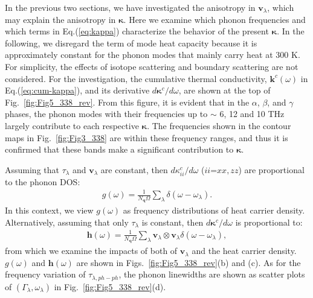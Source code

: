 \documentclass[twocolumn,amsmath,amssymb,a4paper,prb,superscriptaddress,floatfix]{revtex4-1}
\begin{document}
In the previous two sections, we have investigated the anisotropy in
$\mathbf{v}_\lambda$, which may explain the anisotropy in $\boldsymbol{\kappa}$.
Here we examine which phonon frequencies and which terms in Eq.(\ref{eq:kappa})
characterize the behavior of the present $\boldsymbol{\kappa}$. In the
following, we disregard the term of mode heat capacity because it is
approximately constant for the phonon modes that mainly carry heat at 300 K.
For simplicity, the effects of isotope scattering and boundary scattering are
not considered.  For the investigation, the cumulative thermal conductivity,
$\boldsymbol{k}^c(\omega)$ in Eq.(\ref{eq:cum-kappa}), and its derivative
$d\boldsymbol{\kappa}^c/d\omega$, are shown at the top of
Fig.~\ref{fig:Fig5_338_rev}. From this figure, it is evident that in the
$\alpha$, $\beta$, and $\gamma$ phases, the phonon modes with their frequencies
up to $\sim$ 6, 12 and 10 THz largely contribute to each respective
$\boldsymbol{\kappa}$. The frequencies shown in the contour maps in
Fig.~\ref{fig:Fig3_338} are within these frequency ranges, and thus it is
confirmed that these bands make a significant contribution to
$\boldsymbol{\kappa}$.  

Assuming that $\tau_\lambda$ and $\mathbf{v}_\lambda$ are constant, then
$d\kappa_{ii}^c/d\omega$ ($ii$=$xx,zz$) are proportional to the phonon
DOS: 
\begin{align}
 \label{eq:dos}
 g(\omega) = \frac{1}{N_\mathbf{q}\Omega}
 \sum_\lambda
 \delta(\omega-\omega_{\lambda}).
\end{align}
In this context, we view $g(\omega)$ as frequency distributions of heat
carrier density. Alternatively, assuming that only $\tau_\lambda$ is constant,
then $d\boldsymbol{\kappa}^c/d\omega$ is proportional to:
\begin{align}
 \label{eq:wdos}
 \boldsymbol{h}(\omega) = \frac{1}{N_\mathbf{q}\Omega}
 \sum_\lambda
 \mathbf{v}_\lambda \otimes \mathbf{v}_\lambda
 \delta(\omega-\omega_{\lambda}),
\end{align}
from which we examine the impacts of both of $\mathbf{v}_\lambda$ and the heat carrier
density. $g(\omega)$ and  $\boldsymbol{h}(\omega)$
are shown in
Figs.~\ref{fig:Fig5_338_rev}(b) and (c). As for the frequency
variation of $\tau_{\lambda,ph-ph}$, the phonon linewidths are shown as scatter
plots of $(\Gamma_\lambda,\omega_\lambda)$ in Fig.~\ref{fig:Fig5_338_rev}(d).
\end{document}
